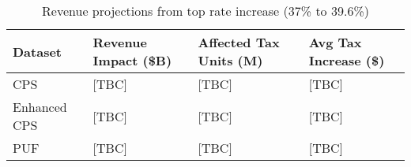 \begin{table}[h]
    \centering
    \caption{Revenue projections from top rate increase (37\% to 39.6\%)}
    \label{tab:top_rate_reform}
    \begin{tabular}{llll}
    \toprule
    Dataset & Revenue Impact (\$B) & Affected Tax Units (M) & Avg Tax Increase (\$) \\
    \midrule
    CPS & [TBC] & [TBC] & [TBC] \\
    Enhanced CPS & [TBC] & [TBC] & [TBC] \\
    PUF & [TBC] & [TBC] & [TBC] \\
    \bottomrule
    \end{tabular}
\end{table}
